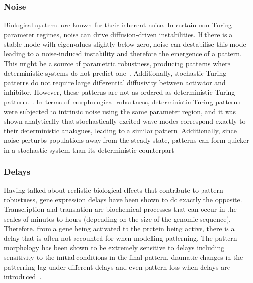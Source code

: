 \subsubsection{Noise}
Biological systems are known for their inherent noise.
In certain non-Turing parameter regimes, noise can drive diffusion-driven instabilities.
If there is a stable mode with eigenvalues slightly below zero, noise can destabilise this mode leading to a noise-induced instability and therefore the emergence of a pattern.
This might be a source of parametric robustness, producing patterns where deterministic systems do not predict one~\parencite{Butler2009, Butler2011, Biancalani2010}.
Additionally, stochastic Turing patterns do not require large differential diffusivity between activator and inhibitor.
However, these patterns are not as ordered as deterministic Turing patterns~\parencite{Karig2018}.
In terms of morphological robustness, deterministic Turing patterns were subjected to intrinsic noise using the same parameter region, and it was shown analytically that stochastically excited wave modes correspond exactly to their deterministic analogues, leading to a similar pattern.
Additionally, since noise perturbs populations away from the steady state, patterns can form quicker in a stochastic system than its deterministic counterpart~\parencite{Maini2012}


\subsubsection{Delays} Having talked about realistic biological effects that contribute to pattern robustness, gene expression delays have been shown to do exactly the opposite.
Transcription and translation are biochemical processes that can occur in the scales of minutes to hours (depending on the size of the genomic sequence).
Therefore, from a gene being activated to the protein being active, there is a delay that is often not accounted for when modelling patterning.
The pattern morphology has been shown to be extremely sensitive to delays including sensitivity to the initial conditions in the final pattern, dramatic changes in the patterning lag under different delays and even pattern loss when delays are introduced~\parencite{Maini2012}.


